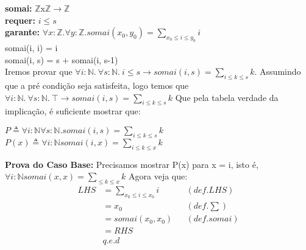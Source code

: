 \documentclass{article}
\begin{document}
\noindent \textbf{somai:} $\mathbb{Z}$x$\mathbb{Z}$$ \rightarrow \mathbb{Z}$\\
\textbf{requer:} $i \le s$ \\
\textbf{garante:} $\forall x:\mathbb{Z}. \forall y:\mathbb{Z}. somai(x_0,y_0) = \sum\limits_{x_0 \le i \le y_0} i$\\
somai(i, i) = i\\
somai(i, s) = s + somai(i, s-1)\\

\noindent Iremos provar que
$\forall i:\mathbb{N}.\:\forall s:\mathbb{N}.\:i \le s \rightarrow somai(i, s) = \sum\limits_{i \le k \le s} k$.
Assumindo que a pré condição seja satisfeita, logo temos que
$\forall i:\mathbb{N}.\:\forall s:\mathbb{N}.\: \top\rightarrow somai(i, s) = \sum\limits_{i \le k \le s} k$
Que pela tabela verdade da implicação, é suficiente mostrar que:
\begin{center}
$P \triangleq \forall i:\mathbb{N} \forall s:\mathbb{N}. somai(i, s) = \sum\limits_{i \le k \le s} k$ \\
$P(x) \triangleq \forall i:\mathbb{N} somai(i, x) = \sum\limits_{i \le k \le x} k$ \\
\end{center}

\noindent \textbf{Prova do Caso Base:} Precisamos mostrar P(x) para x = i, isto é,
$\forall i:\mathbb{N} somai(x, x) = \sum\limits_{ \le k \le x} k$
Agora veja que:
\begin{align*}
LHS &= \sum\limits_{x_0 \le i \le x_0} i && (def. LHS) \\
&= x_0 && (def. \sum) \\
&= somai(x_0, x_0) && (def. somai) \\
&= RHS \\
& q.e.d
\end{align*}
\end{document}

